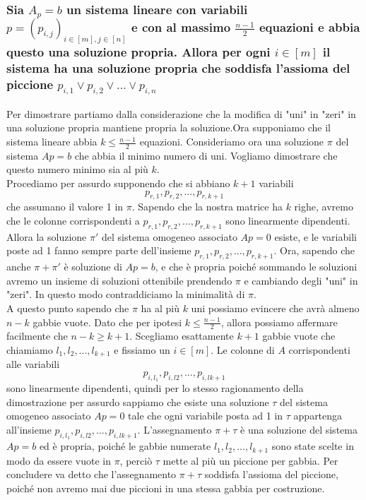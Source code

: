 \documentclass[it]{article}
\begin{document}
    \subsubsection{Sia $A_{p}=b$ un sistema lineare con variabili $p = (p_{i,j} )_{i \in [m],j \in [n]}$ e con al massimo $\frac{n-1}{2}$ equazioni e abbia questo una soluzione propria. Allora per ogni $i \in [m]$ il sistema ha una soluzione propria che soddisfa l’assioma del piccione $p_{i,1} \lor p_{i,2} \lor ... \lor p_{i,n}$}
    Per dimostrare partiamo dalla considerazione che la modifica di "uni" in "zeri" in una soluzione propria mantiene propria la soluzione.Ora supponiamo che il sistema lineare abbia $k \leq \frac{n-1}{2}$ equazioni. Consideriamo ora una soluzione $\pi$ del sistema $Ap=b$ che abbia il minimo numero di uni. Vogliamo dimostrare che questo numero minimo sia al più $\displaystyle k$. \\
    Procediamo per assurdo supponendo che si abbiano $\displaystyle k+1$ variabili  $$p_{r,1},p_{r,2},...,p_{r,k+1}$$ che assumano il valore 1 in $\pi$. Sapendo che la nostra matrice ha $\displaystyle k$ righe, avremo che le colonne corrispondenti a $p_{r,1},p_{r,2},...,p_{r,k+1}$ sono linearmente dipendenti. Allora la soluzione $\pi'$ del sistema omogeneo associato $Ap=0$ esiste, e le variabili poste ad 1 fanno sempre parte dell'insieme {$p_{r,1},p_{r,2},...,p_{r,k+1}$}. Ora, sapendo che anche $\pi + \pi'$ è soluzione di $Ap=b$, e che è propria poiché sommando le soluzioni avremo un insieme di soluzioni ottenibile prendendo $\pi$ e cambiando degli "uni" in "zeri". In questo modo contraddiciamo la minimalità di $\pi$.\\
    A questo punto sapendo che $\pi$ ha al più $\displaystyle k$ uni possiamo evincere che avrà almeno $n-k$ gabbie vuote. Dato che per ipotesi $k \leq \frac{n-1}{2}$, allora possiamo affermare facilmente che $n-k \ge k+1$. Scegliamo esattamente $\displaystyle k+1$ gabbie vuote che chiamiamo $l_{1},l_{2},...,l_{k+1}$ e fissiamo un $i \in [m]$. Le colonne di $\displaystyle A$ corrispondenti alle variabili $$p_{i,l_{1}},p_{i,l{2}},...,p_{i,l{k+1}}$$ sono linearmente dipendenti, quindi per lo stesso ragionamento della dimostrazione per assurdo sappiamo che esiste una soluzione $\tau$ del sistema omogeneo associato $Ap=0$ tale che ogni variabile posta ad 1 in $\tau$ appartenga all'insieme {$p_{i,l_{1}},p_{i,l{2}},...,p_{i,l{k+1}}$}. L'assegnamento $\pi+\tau$ è una soluzione del sistema $Ap=b$ ed è propria, poiché le gabbie numerate $l_{1},l_{2},...,l_{k+1}$ sono state scelte in modo da essere vuote in $\pi$, perciò $\tau$ mette al più un piccione per gabbia. Per concludere va detto che l'assegnamento $\pi+\tau$ soddisfa l'assioma del piccione, poiché non avremo mai due piccioni in una stessa gabbia per costruzione.
\end{document}
